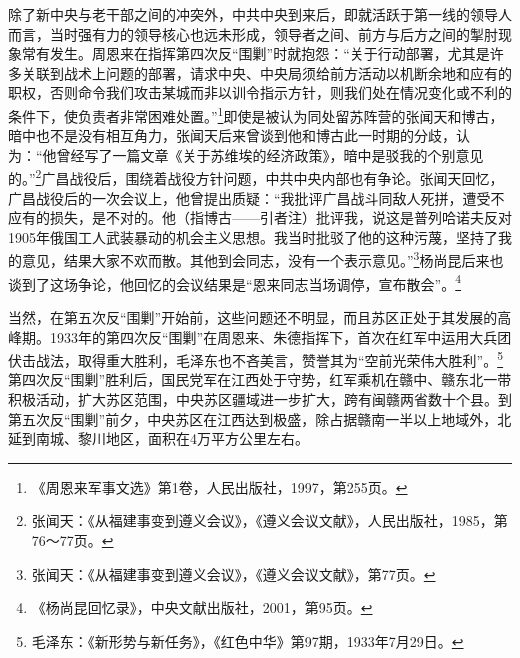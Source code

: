 除了新中央与老干部之间的冲突外，中共中央到来后，即就活跃于第一线的领导人而言，当时强有力的领导核心也远未形成，领导者之间、前方与后方之间的掣肘现象常有发生。周恩来在指挥第四次反“围剿”时就抱怨：“关于行动部署，尤其是许多关联到战术上问题的部署，请求中央、中央局须给前方活动以机断余地和应有的职权，否则命令我们攻击某城而非以训令指示方针，则我们处在情况变化或不利的条件下，使负责者非常困难处置。”\footnote{《周恩来军事文选》第1卷，人民出版社，1997，第255页。}即使是被认为同处留苏阵营的张闻天和博古，暗中也不是没有相互角力，张闻天后来曾谈到他和博古此一时期的分歧，认为：“他曾经写了一篇文章《关于苏维埃的经济政策》，暗中是驳我的个别意见的。”\footnote{张闻天：《从福建事变到遵义会议》，《遵义会议文献》，人民出版社，1985，第76～77页。}广昌战役后，围绕着战役方针问题，中共中央内部也有争论。张闻天回忆，广昌战役后的一次会议上，他曾提出质疑：“我批评广昌战斗同敌人死拼，遭受不应有的损失，是不对的。他（指博古——引者注）批评我，说这是普列哈诺夫反对1905年俄国工人武装暴动的机会主义思想。我当时批驳了他的这种污蔑，坚持了我的意见，结果大家不欢而散。其他到会同志，没有一个表示意见。”\footnote{张闻天：《从福建事变到遵义会议》，《遵义会议文献》，第77页。}杨尚昆后来也谈到了这场争论，他回忆的会议结果是“恩来同志当场调停，宣布散会”。\footnote{《杨尚昆回忆录》，中央文献出版社，2001，第95页。}


当然，在第五次反“围剿”开始前，这些问题还不明显，而且苏区正处于其发展的高峰期。1933年的第四次反“围剿”在周恩来、朱德指挥下，首次在红军中运用大兵团伏击战法，取得重大胜利，毛泽东也不吝美言，赞誉其为“空前光荣伟大胜利”。\footnote{毛泽东：《新形势与新任务》，《红色中华》第97期，1933年7月29日。}第四次反“围剿”胜利后，国民党军在江西处于守势，红军乘机在赣中、赣东北一带积极活动，扩大苏区范围，中央苏区疆域进一步扩大，跨有闽赣两省数十个县。到第五次反“围剿”前夕，中央苏区在江西达到极盛，除占据赣南一半以上地域外，北延到南城、黎川地区，面积在4万平方公里左右。


